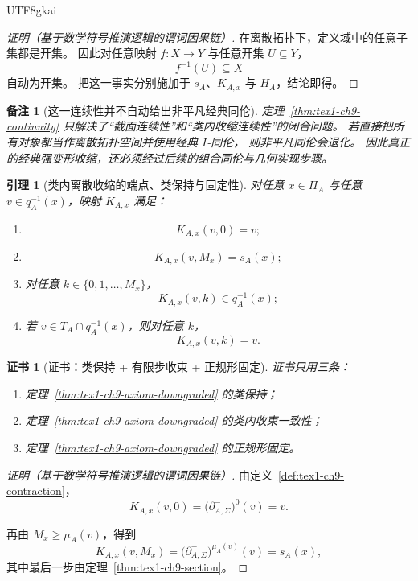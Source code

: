 \documentclass[12pt]{article}
\newtheorem{lemma}{引理}[section]
\newtheorem{remark}{备注}[section]
\newtheorem{Certificate}{证书}[section]
\begin{document}
\begin{CJK*}{UTF8}{gkai}
\begin{proof}[证明（基于数学符号推演逻辑的谓词因果链）]
在离散拓扑下，定义域中的任意子集都是开集。
因此对任意映射 \(f:X\to Y\) 与任意开集 \(U\subseteq Y\)，
\[
  f^{-1}(U)\subseteq X
\]
自动为开集。
把这一事实分别施加于 \(s_A\)、\(K_{A,x}\) 与 \(H_A\)，结论即得。
\end{proof}

\begin{remark}[这一连续性并不自动给出非平凡经典同伦]
定理~\ref{thm:tex1-ch9-continuity} 只解决了“截面连续性”和“类内收缩连续性”的闭合问题。
若直接把所有对象都当作离散拓扑空间并使用经典 \(I\)-同伦，
则非平凡同伦会退化。
因此真正的经典强变形收缩，还必须经过后续的组合同伦与几何实现步骤。
\end{remark}

\begin{lemma}[类内离散收缩的端点、类保持与固定性]
\label{lem:tex1-ch9-fiber}
对任意 \(x\in\Pi_A\) 与任意 \(v\in q_A^{-1}(x)\)，映射 \(K_{A,x}\) 满足：
\begin{enumerate}
  \item
  \[
    K_{A,x}(v,0)=v;
  \]
  \item
  \[
    K_{A,x}(v,M_x)=s_A(x);
  \]
  \item 对任意 \(k\in\{0,1,\dots,M_x\}\)，
  \[
    K_{A,x}(v,k)\in q_A^{-1}(x);
  \]
  \item 若 \(v\in T_A\cap q_A^{-1}(x)\)，则对任意 \(k\)，
  \[
    K_{A,x}(v,k)=v.
  \]
\end{enumerate}
\end{lemma}

\begin{Certificate}[证书：类保持 + 有限步收束 + 正规形固定]
\label{cert:tex1-ch9-fiber}
证书只用三条：
\begin{enumerate}
  \item 定理~\ref{thm:tex1-ch9-axiom-downgraded} 的类保持；
  \item 定理~\ref{thm:tex1-ch9-axiom-downgraded} 的类内收束一致性；
  \item 定理~\ref{thm:tex1-ch9-axiom-downgraded} 的正规形固定。
\end{enumerate}
\end{Certificate}

\begin{proof}[证明（基于数学符号推演逻辑的谓词因果链）]
由定义~\ref{def:tex1-ch9-contraction}，
\[
  K_{A,x}(v,0)
  =
  \bigl(\partial^-_{A,\Sigma}\bigr)^0(v)
  =
  v.
\]

再由 \(M_x\ge \mu_A(v)\)，得到
\[
  K_{A,x}(v,M_x)
  =
  \bigl(\partial^-_{A,\Sigma}\bigr)^{\mu_A(v)}(v)
  =
  s_A(x),
\]
其中最后一步由定理~\ref{thm:tex1-ch9-section}。


\end{proof}
\end{CJK*}
\end{document}
